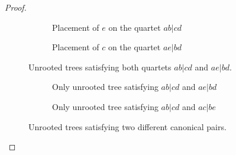 \documentclass[runningheads]{llncs}
\begin{document}
\begin{appendices}
\begin{proof}
\begin{itemize}
\begin{itemize}

\begin{figure}[h]
    \centering
    \begin{subfigure}{0.45\textwidth}
        \centering
        \caption{Placement of $e$ on the quartet $ab|cd$}
        \label{fig:app_place_e_on_ab|cd}
    \end{subfigure}
    \hfill 
    \begin{subfigure}{0.45\textwidth}
        \centering
        \caption{Placement of $c$ on the quartet $ae|bd$}
        \label{fig:app_place_c_on_ae|bd}
    \end{subfigure}
    \caption{Unrooted trees satisfying both quartets $ab|cd$ and $ae|bd$.}
    \label{fig:app_comparison_e_and_c}
\end{figure}

\begin{figure}[h]
    \centering
    \begin{subfigure}{0.45\textwidth}
        \centering
        \caption{Only unrooted tree satisfying $ab|cd$ and $ae|bd$}
        \label{fig:app_unrooted_tree_1}
    \end{subfigure}
    \hfill 
    \centering
    \begin{subfigure}{0.45\textwidth}
        \centering
        \caption{Only unrooted tree satisfying $ab|cd$ and $ac|be$}
        \label{fig:app_unrooted_tree_2}
    \end{subfigure}
    \caption{Unrooted trees satisfying two different canonical pairs.}
    
\end{figure}




\end{itemize}
\end{itemize}
\end{proof}
\end{appendices}
\end{document}

